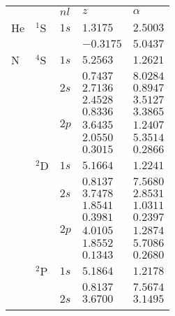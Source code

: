 {{{{%
\begin{table}
\begin{center}
\begin{tabularx}{\textwidth}{
>{\centering\arraybackslash}p{}
>{\centering\arraybackslash}p{}
>{\centering\arraybackslash}p{}
>{\centering\arraybackslash}p{}
>{\centering\arraybackslash}p{}}
\rowcolor{mydarkgray} 
   &       & $nl$ & $z$        & $\alpha$   \\
He & $^1$S & $1s$ &  $1.3175$ & $2.5003$  \\\rowcolor{mygray} 
   &       &      & $-0.3175$ & $5.0437$  \\ 
N  & $^4$S & $1s$ & $5.2563$ & $1.2621$  \\\rowcolor{mygray} 
   &       &      & $0.7437$ & $8.0284$  \\ 
   &       & $2s$ & $2.7136$ & $0.8947$ \\\rowcolor{mygray} 
   &       &      & $2.4528$ & $3.5127$  \\
   &       &      & $0.8336$ & $3.3865$  \\ \rowcolor{mygray} 
   &       & $2p$ & $3.6435$ & $1.2407$  \\ 
   &       &      & $2.0550$ & $5.3514$  \\\rowcolor{mygray} 
   &       &      & $0.3015$ & $0.2866$ \\
   & $^2$D & $1s$ & $5.1664$ & $1.2241$  \\\rowcolor{mygray} 
   &       &      & $0.8137$ & $7.5680$  \\ 
   &       & $2s$ & $3.7478$ & $2.8531$  \\\rowcolor{mygray} 
   &       &      & $1.8541$ & $1.0311$  \\ 
   &       &      & $0.3981$ & $0.2397$ \\\rowcolor{mygray} 
   &       & $2p$ & $4.0105$ & $1.2874$  \\ 
   &       &      & $1.8552$ & $5.7086$  \\\rowcolor{mygray} 
   &       &      & $0.1343$ & $0.2680$ \\
   & $^2$P & $1s$ & $5.1864$ & $1.2178$  \\\rowcolor{mygray} 
   &       &      & $0.8137$ & $7.5674$  \\ 
   &       & $2s$ & $3.6700$ & $3.1495$  \\\rowcolor{mygray} 

\end{tabularx}
\end{center}
\end{table}}}}}
